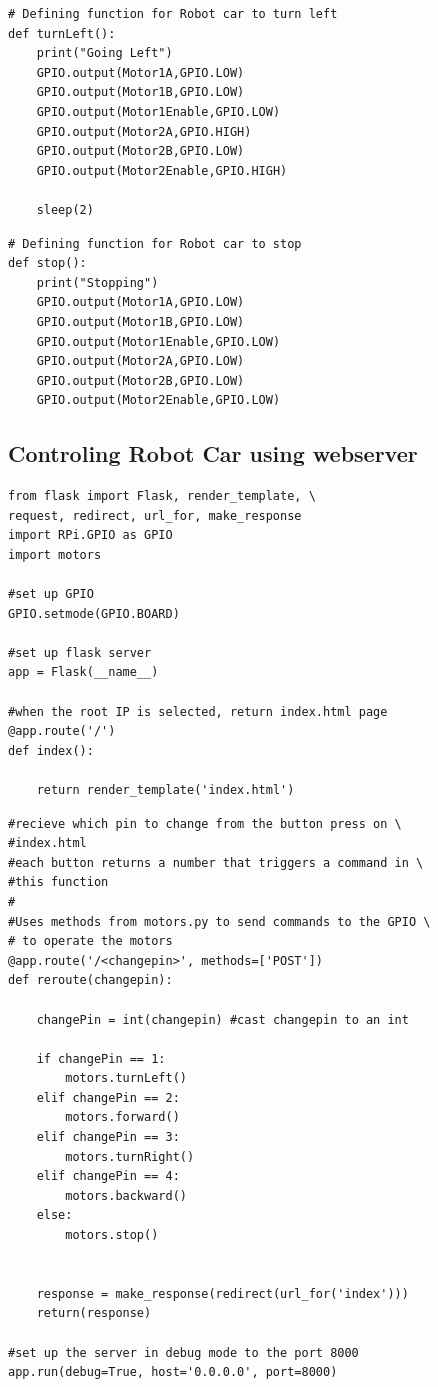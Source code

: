 \begin{verbatim}
# Defining function for Robot car to turn left
def turnLeft():
	print("Going Left")
	GPIO.output(Motor1A,GPIO.LOW)
	GPIO.output(Motor1B,GPIO.LOW)
	GPIO.output(Motor1Enable,GPIO.LOW)
	GPIO.output(Motor2A,GPIO.HIGH)
	GPIO.output(Motor2B,GPIO.LOW)
	GPIO.output(Motor2Enable,GPIO.HIGH)

	sleep(2)
\end{verbatim}

\begin{verbatim}
# Defining function for Robot car to stop
def stop():
	print("Stopping")
	GPIO.output(Motor1A,GPIO.LOW)
	GPIO.output(Motor1B,GPIO.LOW)
	GPIO.output(Motor1Enable,GPIO.LOW)
	GPIO.output(Motor2A,GPIO.LOW)
	GPIO.output(Motor2B,GPIO.LOW)
	GPIO.output(Motor2Enable,GPIO.LOW)
\end{verbatim}

\subsection{Controling Robot Car using webserver}
\begin{verbatim}
from flask import Flask, render_template, \ 
request, redirect, url_for, make_response
import RPi.GPIO as GPIO
import motors

#set up GPIO
GPIO.setmode(GPIO.BOARD) 

#set up flask server
app = Flask(__name__) 

#when the root IP is selected, return index.html page
@app.route('/')
def index():

	return render_template('index.html')
\end{verbatim}

\begin{verbatim}
#recieve which pin to change from the button press on \ 
#index.html
#each button returns a number that triggers a command in \ 
#this function
#
#Uses methods from motors.py to send commands to the GPIO \ 
# to operate the motors
@app.route('/<changepin>', methods=['POST'])
def reroute(changepin):

	changePin = int(changepin) #cast changepin to an int

	if changePin == 1:
		motors.turnLeft()
	elif changePin == 2:
		motors.forward()
	elif changePin == 3:
		motors.turnRight()
	elif changePin == 4:
		motors.backward()
	else:
		motors.stop()


	response = make_response(redirect(url_for('index')))
	return(response)

#set up the server in debug mode to the port 8000
app.run(debug=True, host='0.0.0.0', port=8000) 
\end{verbatim}

